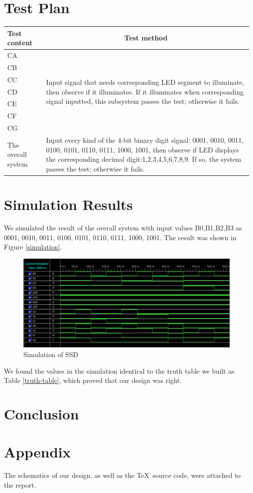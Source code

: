 \documentclass{article}
\begin{document}
\section{Test Plan}
\begin{center}
\begin{tabular}{|m{3cm}<{\centering}|m{10cm}|}
\hline
Test content & \multicolumn{1}{c|}{Test method} \\\hline
CA & \multirow{7}{10cm}{Input signal that needs corresponding LED segment to illuminate, then observe if it illuminates. If it illuminates when corresponding signal inputted, this subsystem passes the test; otherwise it fails.} \\\cline{1-1}
CB & \\\cline{1-1}
CC & \\\cline{1-1}
CD & \\\cline{1-1}
CE & \\\cline{1-1}
CF & \\\cline{1-1}
CG & \\\hline
The overall system & Input every kind of the 4-bit binary digit signal: 0001, 0010, 0011, 0100, 0101, 0110, 0111, 1000, 1001, then observe if LED displays the corresponding decimal digit:1,2,3,4,5,6,7,8,9. If so, the system passes the test; otherwise it fails. \\\hline
\end{tabular}
\end{center}

\section{Simulation Results}
We simulated the result of the overall system with input values B0,B1,B2,B3 as 0001, 0010, 0011, 0100, 0101, 0110, 0111, 1000, 1001. The result was shown in Figure \ref{simulation}.

\begin{figure}[!hbtp]
\centering
\includegraphics[width=0.9\linewidth]{simulation.png}
\caption{Simulation of SSD}
\label{design-ssd}
\end{figure}

We found the values in the simulation identical to the truth table we built as Table \ref{truth-table}, which proved that our design was right.

\newpage

\section{Conclusion}


\section{Appendix}
The schematics of our design, as well as the \TeX\ source code, were attached to the report.
\end{document}
